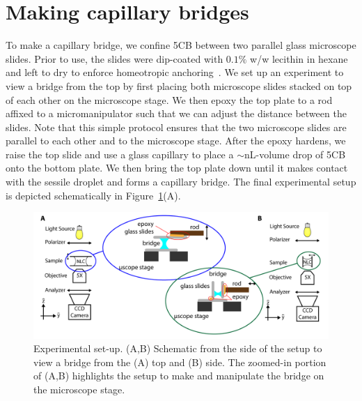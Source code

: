 \section{Making capillary bridges}
To make a capillary bridge, we confine 5CB between two parallel glass microscope slides.
Prior to use, the slides were dip-coated with $0.1\%$ w/w lecithin in hexane and left to dry to enforce homeotropic anchoring~\cite{RN140}.
We set up an experiment to view a bridge from the top by first placing both microscope slides stacked on top of each other on the microscope stage.
We then epoxy the top plate to a rod affixed to a micromanipulator such that we can adjust the distance between the slides.
Note that this simple protocol ensures that the two microscope slides are parallel to each other and to the microscope stage.
After the epoxy hardens, we raise the top slide and use a glass capillary to place a $\sim$nL-volume drop of 5CB onto the bottom plate.
We then bring the top plate down until it makes contact with the sessile droplet and forms a capillary bridge.
The final experimental setup is depicted schematically in Figure~\ref{f:5-BuildSchemaic}(A).
\begin{figure}
  \centering
  \includegraphics{figures/C5/Ch5-Figs_BuildSchematic.png}
  \caption{Experimental set-up.
  (A,B) Schematic from the side of the setup to view a bridge from the (A) top and (B) side.
  The zoomed-in portion of (A,B) highlights the setup to make and manipulate the bridge on the microscope stage.}\label{f:5-BuildSchemaic}
\end{figure}

